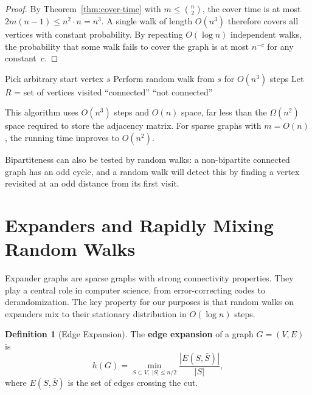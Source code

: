 \documentclass[twoside,12pt]{book}
\theoremstyle{plain}
\theoremstyle{definition}
\newtheorem{definition}[theorem]{Definition}
\theoremstyle{remark}
\begin{document}
\begin{proof}
By Theorem~\ref{thm:cover-time} with $m \leq \binom{n}{2}$, the cover
time is at most $2m(n-1) \leq n^2 \cdot n = n^3$. A single walk of length
$O(n^3)$ therefore covers all vertices with constant probability. By
repeating $O(\log n)$ independent walks, the probability that some walk
fails to cover the graph is at most $n^{-c}$ for any constant~$c$.
\end{proof}

\begin{algorithm}[H]\label{alg:rw-connectivity}
\caption{Connectivity Testing via Random Walk}
\begin{algorithmic}[1]
\State Pick arbitrary start vertex $s$
\State Perform random walk from $s$ for $O(n^3)$ steps
\State Let $R$ = set of vertices visited
    \State \Return ``connected''
\Else
    \State \Return ``not connected''
\EndIf
\end{algorithmic}
\end{algorithm}

This algorithm uses $O(n^3)$ steps and $O(n)$ space, far less than the
$\Omega(n^2)$ space required to store the adjacency matrix. For sparse
graphs with $m = O(n)$, the running time improves to $O(n^2)$.

Bipartiteness can also be tested by random walks: a non-bipartite
connected graph has an odd cycle, and a random walk will detect this by
finding a vertex revisited at an odd distance from its first visit.

\section{Expanders and Rapidly Mixing Random Walks}
\label{sec:expanders-bis}

Expander graphs are sparse graphs with strong connectivity properties.
They play a central role in computer science, from error-correcting codes
to derandomization. The key property for our purposes is that random walks
on expanders mix to their stationary distribution in $O(\log n)$ steps.

\begin{definition}[Edge Expansion]\label{def:edge-expansion}
The \textbf{edge expansion} of a graph $G = (V, E)$ is
\[
    h(G) = \min_{S \subset V,\; |S| \leq n/2}
    \frac{|E(S, \bar{S})|}{|S|},
\]
where $E(S, \bar{S})$ is the set of edges crossing the cut.
\end{definition}
\end{document}
